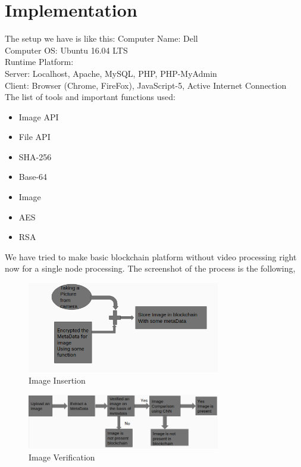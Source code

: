 \chapter{Implementation}
\label{Ch5}
\bigskip

The setup we have is like this:
Computer Name: Dell\\
Computer OS: Ubuntu 16.04 LTS\\
Runtime Platform:\\
	Server: Localhost, Apache, MySQL, PHP, PHP-MyAdmin\\
	Client: Browser (Chrome, FireFox), JavaScript-5, Active Internet Connection\\

The list of tools and important functions used:
\begin{itemize}
\item Image API
\item File API
\item SHA-256
\item Base-64
\item Image
\item AES
\item RSA
\end{itemize}
	


We have tried to make basic blockchain platform without video processing right now for a single node processing. The screenshot of the process is the following,


\begin{figure}
\begin{center}
\includegraphics[width=0.75\textwidth]{./img_src/upload.png}
\end{center}
\caption{Image Insertion}
\end{figure}

\begin{figure}
\begin{center}
\includegraphics[width=0.75\textwidth]{./img_src/verify.png}
\end{center}
\caption{Image Verification}
\end{figure}


